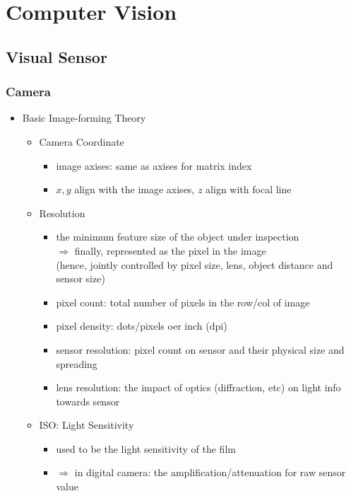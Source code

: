 \section{Computer Vision}
\subsection{Visual Sensor}
\subsubsection{Camera}
\begin{itemize}
\item Basic Image-forming Theory
	\begin{itemize}
	\item Camera Coordinate
		\begin{itemize}
		\item image axises: same as axises for matrix index
		\item $x,y$ align with the image axises, $z$ align with focal line
		\end{itemize}
	\item Resolution
		\begin{itemize}
		\item the minimum feature size of the object under inspection \\
		$\Rightarrow$ finally, represented as the pixel in the image \\
		(hence, jointly controlled by pixel size, lens, object distance and sensor size)
		\item pixel count: total number of pixels in the row/col of image
		\item pixel density: dots/pixels oer inch (dpi)
		\item sensor resolution: pixel count on sensor and their physical size and spreading
		\item lens resolution: the impact of optics (diffraction, etc) on light info towards sensor
		\end{itemize}
	\item ISO: Light Sensitivity
		\begin{itemize}
		\item used to be the light sensitivity of the film
		\item $\Rightarrow$ in digital camera: the amplification/attenuation for raw sensor value \\

\end{itemize}
\end{itemize}
\end{itemize}
